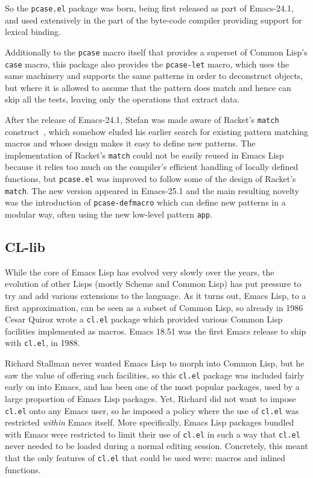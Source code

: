 \documentclass[format=acmsmall, review]{acmart}
\newcommand \Elisp {Emacs Lisp}
\begin{document}
So the \texttt{pcase.el} package was born,
being first released as part of Emacs-24.1, and used extensively in the part
of the byte-code compiler providing support for lexical binding.

Additionally to the \texttt{pcase} macro itself that provides a superset of
Common Lisp's \texttt{case} macro, this package also provides the
\texttt{pcase-let} macro, which uses the same machinery and supports the same
patterns in order to deconstruct objects, but where it is allowed to assume
that the pattern does match and hence can skip all the tests, leaving only the
operations that extract data.

After the release of Emacs-24.1, Stefan was made aware of Racket's
\texttt{match} construct~\cite{RacketReference2018}, which somehow eluded
his earlier search for
existing pattern matching macros and whose design makes it easy to define
new patterns.  The implementation of Racket's \texttt{match} could not be
easily reused in \Elisp{} because it relies too much on the compiler's
efficient handling of locally defined functions, but \texttt{pcase.el} was
improved to follow some of the design of Racket's \texttt{match}.
The new version appeared in Emacs-25.1 and the main resulting novelty was the
introduction of \texttt{pcase-defmacro} which can define new patterns
in a modular way, often using the new low-level pattern \texttt{app}.

\subsection{CL-lib}          %
\label{sec:cl-clib}

While the core of \Elisp{} has evolved very slowly over the years, the
evolution of other Lisps (mostly Scheme and Common Lisp) has put pressure to
try and add various extensions to the language.  As it turns out, \Elisp{},
to a first approximation, can be seen as a subset of Common Lisp, so already
in 1986 Cesar Quiroz  wrote a \texttt{cl.el} package which provided various
Common Lisp facilities implemented as macros.  Emacs 18.51 was the
first Emacs release to ship with \texttt{cl.el}, in 1988.

Richard Stallman never wanted \Elisp{} to morph into Common Lisp, but he saw
the value of offering such facilities, so this \texttt{cl.el} package was
included fairly early on into Emacs, and has been one of the most popular
packages, used by a large proportion of \Elisp{} packages.  Yet, Richard did
not want to impose \texttt{cl.el} onto any Emacs user, so he imposed
a policy where the use of \texttt{cl.el} was restricted \emph{within} Emacs
itself.  More specifically, \Elisp{} packages bundled with Emacs were
restricted to limit their use of \texttt{cl.el} in such a way that
\texttt{cl.el} never needed to be loaded during a normal editing session.
Concretely, this meant that the only features of \texttt{cl.el} that could
be used were: macros and inlined functions.
\end{document}
